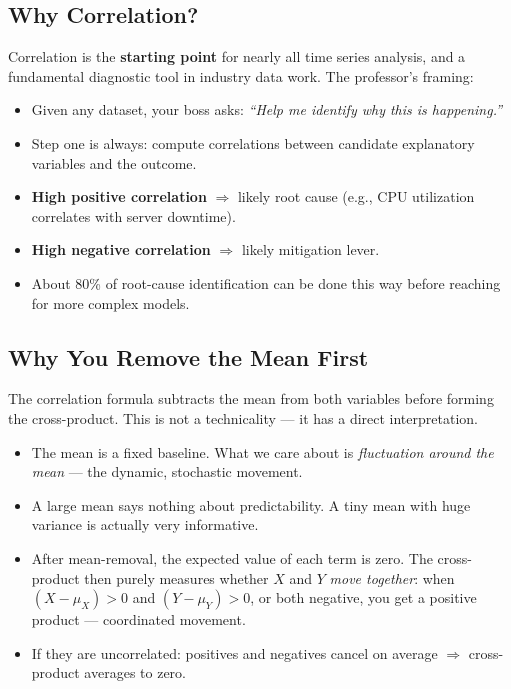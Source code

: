 \documentclass[11pt]{article}
\begin{document}
\subsection{Why Correlation?}
Correlation is the \textbf{starting point} for nearly all time series analysis, and
a fundamental diagnostic tool in industry data work. The professor's framing:

\begin{itemize}
    \item Given any dataset, your boss asks: \textit{``Help me identify why this
      is happening.''}
    \item Step one is always: compute correlations between candidate explanatory
      variables and the outcome.
    \item \textbf{High positive correlation} $\Rightarrow$ likely root cause
      (e.g., CPU utilization correlates with server downtime).
    \item \textbf{High negative correlation} $\Rightarrow$ likely mitigation lever.
    \item About 80\% of root-cause identification can be done this way before
      reaching for more complex models.
\end{itemize}

\subsection{Why You Remove the Mean First}
The correlation formula subtracts the mean from both variables before forming the
cross-product. This is not a technicality --- it has a direct interpretation.

\begin{itemize}
    \item The mean is a fixed baseline. What we care about is
      \emph{fluctuation around the mean} --- the dynamic, stochastic movement.
    \item A large mean says nothing about predictability. A tiny mean with huge
      variance is actually very informative.
    \item After mean-removal, the expected value of each term is zero. The
      cross-product then purely measures whether $X$ and $Y$ \emph{move together}:
      when $(X - \mu_X) > 0$ and $(Y - \mu_Y) > 0$, or both negative, you get
      a positive product --- coordinated movement.
    \item If they are uncorrelated: positives and negatives cancel on average
      $\Rightarrow$ cross-product averages to zero.
\end{itemize}
\end{document}
